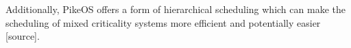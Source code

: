 Additionally, PikeOS offers a form of hierarchical scheduling which can make the scheduling of mixed criticality systems more efficient and potentially easier [source].

